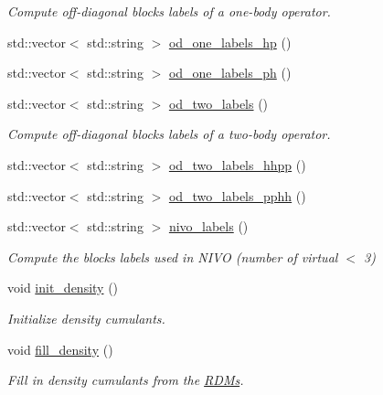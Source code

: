 \begin{DoxyCompactItemize}
\begin{DoxyCompactList}\small\item\em Compute off-\/diagonal blocks labels of a one-\/body operator. \end{DoxyCompactList}\item 
std\+::vector$<$ std\+::string $>$ \mbox{\hyperlink{classforte_1_1_s_a_d_s_r_g_aa05b14ac3d71e33b9ff5b92c6239c73a}{od\+\_\+one\+\_\+labels\+\_\+hp}} ()
\item 
std\+::vector$<$ std\+::string $>$ \mbox{\hyperlink{classforte_1_1_s_a_d_s_r_g_a29d2054db27c671392f9f76573c6aa9e}{od\+\_\+one\+\_\+labels\+\_\+ph}} ()
\item 
std\+::vector$<$ std\+::string $>$ \mbox{\hyperlink{classforte_1_1_s_a_d_s_r_g_a44b6a6edc4836d85f9433132f723b6df}{od\+\_\+two\+\_\+labels}} ()
\begin{DoxyCompactList}\small\item\em Compute off-\/diagonal blocks labels of a two-\/body operator. \end{DoxyCompactList}\item 
std\+::vector$<$ std\+::string $>$ \mbox{\hyperlink{classforte_1_1_s_a_d_s_r_g_a6b8eced41b12858435216547a265b263}{od\+\_\+two\+\_\+labels\+\_\+hhpp}} ()
\item 
std\+::vector$<$ std\+::string $>$ \mbox{\hyperlink{classforte_1_1_s_a_d_s_r_g_ad2b73b7a77b582cb10347263de0bf92c}{od\+\_\+two\+\_\+labels\+\_\+pphh}} ()
\item 
std\+::vector$<$ std\+::string $>$ \mbox{\hyperlink{classforte_1_1_s_a_d_s_r_g_a97cd348287afc1fa958f38f2394e911f}{nivo\+\_\+labels}} ()
\begin{DoxyCompactList}\small\item\em Compute the blocks labels used in N\+I\+VO (number of virtual $<$ 3) \end{DoxyCompactList}\item 
void \mbox{\hyperlink{classforte_1_1_s_a_d_s_r_g_a05d2da19a1410e1e50d887b5e9fcc1fe}{init\+\_\+density}} ()
\begin{DoxyCompactList}\small\item\em Initialize density cumulants. \end{DoxyCompactList}\item 
void \mbox{\hyperlink{classforte_1_1_s_a_d_s_r_g_a9ab33f928ae2c9f1217848267440d955}{fill\+\_\+density}} ()
\begin{DoxyCompactList}\small\item\em Fill in density cumulants from the \mbox{\hyperlink{classforte_1_1_r_d_ms}{R\+D\+Ms}}. \end{DoxyCompactList}\item 

\end{DoxyCompactItemize}
